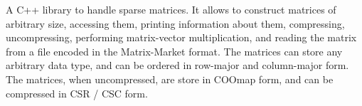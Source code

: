 A C++ library to handle sparse matrices. It allows to construct matrices of arbitrary size, accessing them, printing information about them, compressing, uncompressing, performing matrix-\/vector multiplication, and reading the matrix from a file encoded in the Matrix-\/\+Market format. The matrices can store any arbitrary data type, and can be ordered in row-\/major and column-\/major form. The matrices, when uncompressed, are store in COOmap form, and can be compressed in CSR / CSC form. 